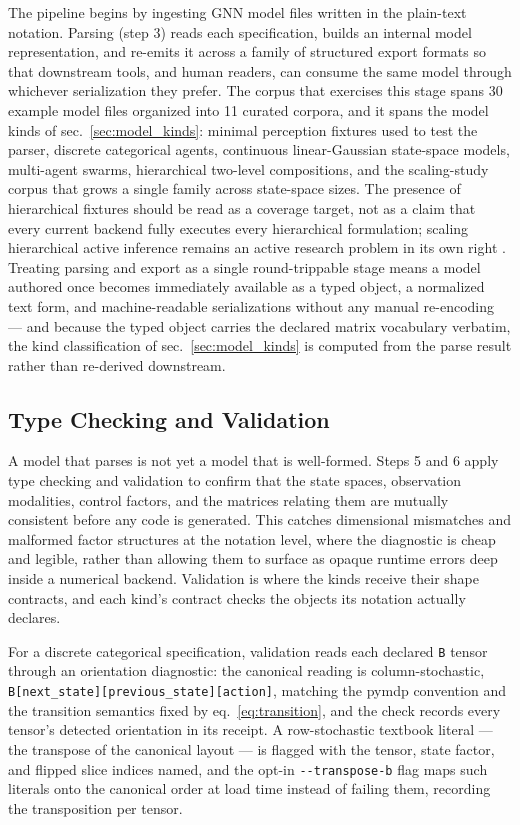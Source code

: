 \documentclass[
  english,
  9pt,
]{extarticle}
\begin{document}
The pipeline begins by ingesting GNN model files written in the
plain-text notation. Parsing (step 3) reads each specification, builds
an internal model representation, and re-emits it across a family of
structured export formats so that downstream tools, and human readers,
can consume the same model through whichever serialization they prefer.
The corpus that exercises this stage spans 30 example model files
organized into 11 curated corpora, and it spans the model kinds of
sec.~\ref{sec:model_kinds}: minimal perception fixtures used to test the
parser, discrete categorical agents, continuous linear-Gaussian
state-space models, multi-agent swarms, hierarchical two-level
compositions, and the scaling-study corpus that grows a single family
across state-space sizes. The presence of hierarchical fixtures should
be read as a coverage target, not as a claim that every current backend
fully executes every hierarchical formulation; scaling hierarchical
active inference remains an active research problem in its own right
\citep{rangarajan2026hierarchicalSuccessor}. Treating parsing and export
as a single round-trippable stage means a model authored once becomes
immediately available as a typed object, a normalized text form, and
machine-readable serializations without any manual re-encoding --- and
because the typed object carries the declared matrix vocabulary
verbatim, the kind classification of sec.~\ref{sec:model_kinds} is
computed from the parse result rather than re-derived downstream.

\subsection{Type Checking and
Validation}\label{type-checking-and-validation}

A model that parses is not yet a model that is well-formed. Steps 5 and
6 apply type checking and validation to confirm that the state spaces,
observation modalities, control factors, and the matrices relating them
are mutually consistent before any code is generated. This catches
dimensional mismatches and malformed factor structures at the notation
level, where the diagnostic is cheap and legible, rather than allowing
them to surface as opaque runtime errors deep inside a numerical
backend. Validation is where the kinds receive their shape contracts,
and each kind's contract checks the objects its notation actually
declares.

For a discrete categorical specification, validation reads each declared
\texttt{B} tensor through an orientation diagnostic: the canonical
reading is column-stochastic,
\texttt{B{[}next\_state{]}{[}previous\_state{]}{[}action{]}}, matching
the pymdp convention \citep{heins2022} and the transition semantics
fixed by eq.~\ref{eq:transition}, and the check records every tensor's
detected orientation in its receipt. A row-stochastic textbook literal
--- the transpose of the canonical layout --- is flagged with the
tensor, state factor, and flipped slice indices named, and the opt-in
\texttt{-\/-transpose-b} flag maps such literals onto the canonical
order at load time instead of failing them, recording the transposition
per tensor.
\end{document}
